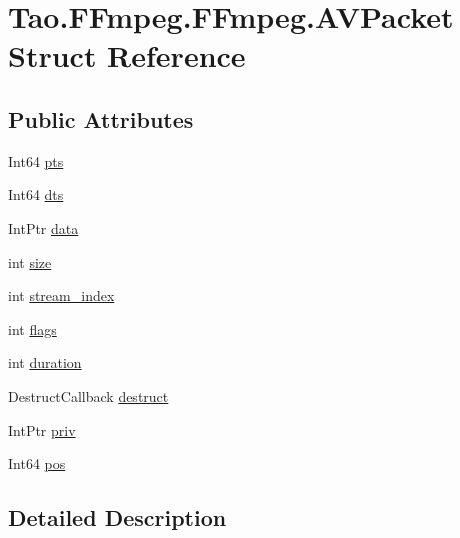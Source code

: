 \hypertarget{struct_tao_1_1_f_fmpeg_1_1_f_fmpeg_1_1_a_v_packet}{
\section{Tao.FFmpeg.FFmpeg.AVPacket Struct Reference}
\label{struct_tao_1_1_f_fmpeg_1_1_f_fmpeg_1_1_a_v_packet}
}
\subsection*{Public Attributes}
\begin{DoxyCompactItemize}
\item 
Int64 \hyperlink{struct_tao_1_1_f_fmpeg_1_1_f_fmpeg_1_1_a_v_packet_abec653926922d6496d45598dec918ef2}{pts}
\item 
Int64 \hyperlink{struct_tao_1_1_f_fmpeg_1_1_f_fmpeg_1_1_a_v_packet_a1a953b628b7611ccf1e550a07392c5f4}{dts}
\item 
IntPtr \hyperlink{struct_tao_1_1_f_fmpeg_1_1_f_fmpeg_1_1_a_v_packet_afbd541634cc2521b03755f07a26504d7}{data}
\item 
int \hyperlink{struct_tao_1_1_f_fmpeg_1_1_f_fmpeg_1_1_a_v_packet_a48d7ba4dde657a9a9a6b87b076412442}{size}
\item 
int \hyperlink{struct_tao_1_1_f_fmpeg_1_1_f_fmpeg_1_1_a_v_packet_ac3e1eb9918e273ec13f410fa9967d266}{stream\_\-index}
\item 
int \hyperlink{struct_tao_1_1_f_fmpeg_1_1_f_fmpeg_1_1_a_v_packet_ac6c13e2bbae967d639ff5fce40ddc9fd}{flags}
\item 
int \hyperlink{struct_tao_1_1_f_fmpeg_1_1_f_fmpeg_1_1_a_v_packet_a3f0fdf9289469906f5e243259894847b}{duration}
\item 
DestructCallback \hyperlink{struct_tao_1_1_f_fmpeg_1_1_f_fmpeg_1_1_a_v_packet_a8ea7d3e001ba2d58d2f86615df550eee}{destruct}
\item 
IntPtr \hyperlink{struct_tao_1_1_f_fmpeg_1_1_f_fmpeg_1_1_a_v_packet_a0d94d0daece831ea8250b16d74f0162c}{priv}
\item 
Int64 \hyperlink{struct_tao_1_1_f_fmpeg_1_1_f_fmpeg_1_1_a_v_packet_a147a513357d706d4b52314261a167139}{pos}
\end{DoxyCompactItemize}


\subsection{Detailed Description}


